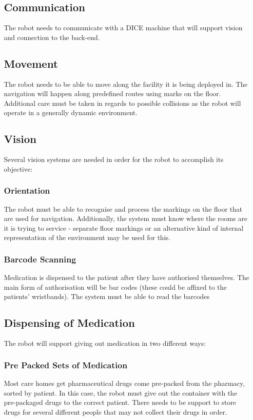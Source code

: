 \documentclass[a4paper,10pt,DIV10,openright,openbib]{scrreprt}
\begin{document}
\subsection{Communication}
The robot needs to communicate with a DICE machine that will support vision and
connection to the back-end.
\subsection{Movement}
The robot needs to be able to move along the facility it is being deployed in.
The navigation will happen along predefined routes using marks on the floor.
Additional care must be taken in regards to possible collisions as the robot
will operate in a generally dynamic environment. 
\subsection{Vision}
Several vision systems are needed in order for the robot to accomplish its objective:
\subsubsection{Orientation}
The robot must be able to recognise and process the markings on the floor that
are used for navigation. Additionally, the system must know where the rooms are
it is trying to service - separate floor markings or an alternative kind of
internal representation of the environment may be used for this.
\subsubsection{Barcode Scanning}
Medication is dispensed to the patient after they have authorised themselves.
The main form of authorisation will be bar codes (these could be affixed to the
patients' wristbands). The system must be able to read the barcodes

\subsection{Dispensing of Medication}
The robot will support giving out medication in two different ways:
\subsubsection{Pre Packed Sets of Medication} Most care homes get pharmaceutical drugs come
pre-packed from the pharmacy, sorted by patient. In this case, the robot must
give out the container with the pre-packaged drugs to the correct patient. There
needs to be support to store drugs for several different people that may not
collect their drugs in order.
\end{document}

